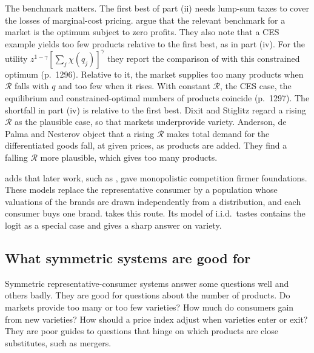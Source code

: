 The benchmark matters. The first best of part (ii) needs lump-sum taxes to cover the losses of marginal-cost pricing.
 argue that the relevant benchmark for a market is the optimum subject to
zero profits. They also note that a CES example yields too few products relative to the first best, as in part (iv).
For the utility $z^{1-\gamma}[\sum_j\chi(q_j)]^\gamma$ they report the comparison of \citet{DixitStiglitz1977} with this
constrained optimum (p.~1296). Relative to it, the market supplies too many products when $\mathcal{R}$ falls with $q$
and too few when it rises. With constant $\mathcal{R}$, the CES case, the equilibrium and constrained-optimal numbers
of products coincide (p.~1297). The shortfall in part (iv) is relative to the first best. Dixit and
Stiglitz regard a rising $\mathcal{R}$ as the plausible case, so that markets underprovide variety. Anderson, de Palma
and Nesterov object that a rising $\mathcal{R}$ makes total demand for the differentiated goods fall, at given prices,
as products are added. They find a falling $\mathcal{R}$ more plausible, which gives too many products.

 adds that later work, such as \citet{PerloffSalop1985}, gave monopolistic
competition firmer foundations. These models replace the representative consumer by a population whose valuations of the
brands are drawn independently from a distribution, and each consumer buys one brand.  takes
this route. Its model of i.i.d.\ tastes contains the logit as a special case and gives a sharp answer on variety.

\subsection{What symmetric systems are good for}\label{sec:04-repcons-uses}

Symmetric representative-consumer systems answer some questions well and others badly. They are good for questions
about the number of products. Do markets provide too many or too few varieties? How much do consumers gain from new
varieties? How should a price index adjust when varieties enter or exit? They are poor guides to questions that hinge
on which products are close substitutes, such as mergers.


